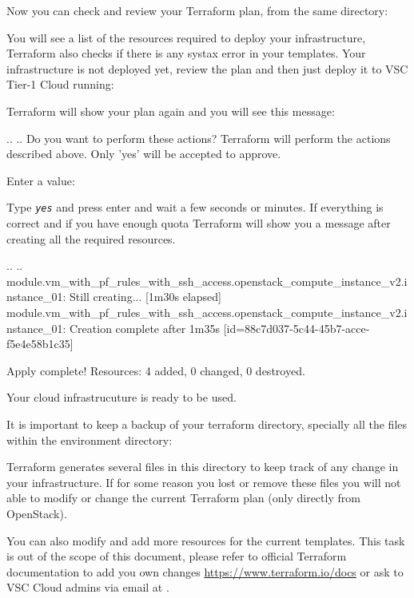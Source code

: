 \begin{prompt}
\end{prompt}

Now you can check and review your Terraform plan, from the same directory:

\begin{prompt}
\end{prompt}

You will see a list of the resources required to deploy your infrastructure, Terraform also
checks if there is any systax error in your templates.
Your infrastructure is not deployed yet, review the plan and then just deploy it to VSC Tier-1 Cloud running:

\begin{prompt}
\end{prompt}

Terraform will show your plan again and you will see this message:

\begin{prompt}
..
..
Do you want to perform these actions?
  Terraform will perform the actions described above.
  Only 'yes' will be accepted to approve.

  Enter a value: 
\end{prompt}

Type \texttt{\emph{yes}} and press enter and wait a few seconds or minutes.
If everything is correct and if you have enough quota Terraform will show you a message
after creating all the required resources.


\begin{prompt}
..
..
module.vm_with_pf_rules_with_ssh_access.openstack_compute_instance_v2.instance_01: Still creating... [1m30s elapsed]
module.vm_with_pf_rules_with_ssh_access.openstack_compute_instance_v2.instance_01: Creation complete after 1m35s [id=88c7d037-5c44-45b7-acce-f5e4e58b1c35]

Apply complete! Resources: 4 added, 0 changed, 0 destroyed.
\end{prompt}

Your cloud infrastrucuture is ready to be used.

It is important to keep a backup of your terraform directory, specially all the files
within the environment directory:

\begin{prompt}
\end{prompt}

Terraform generates several files in this directory to keep track of any change in your infrastructure.
If for some reason you lost or remove these files you will not able to modify or change the
current Terraform plan (only directly from OpenStack).

You can also modify and add more resources for the current templates. This task is out of the scope
of this document, please refer to official Terraform documentation to add you own changes
\url{https://www.terraform.io/docs} or ask to VSC Cloud admins via email at \cloudinfo.


